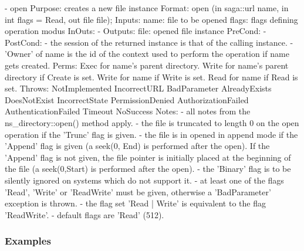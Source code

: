 \begin{myspec}
 
    - open
      Purpose:  creates a new file instance
      Format:   open               (in  saga::url name,
                                    in  int       flags = Read,
                                    out file      file);
      Inputs:   name:               file to be opened
                flags:              flags defining operation
                                    modus
      InOuts:   -
      Outputs:  file:               opened file instance
      PreCond:  -
      PostCond: - the session of the returned instance is that of
                  the calling instance.
                - 'Owner' of name is the id of the context
                  used to perform the operation if name gets
                  created.
      Perms:    Exec  for name's parent directory.
                Write for name's parent directory if Create is set.
                Write for name if Write is set.
                Read  for name if Read  is set.
      Throws:   NotImplemented
                IncorrectURL
                BadParameter
                AlreadyExists
                DoesNotExist
                IncorrectState
                PermissionDenied
                AuthorizationFailed
                AuthenticationFailed
                Timeout
                NoSuccess
      Notes:    - all notes from the ns_directory::open() method
                  apply.
                - the file is truncated to length 0 on the open
                  operation if the 'Trunc' flag is given.
                - the file is in opened in append mode if the
                  'Append' flag is given (a seek(0, End) is
                  performed after the open).  If the 'Append'
                  flag is not given, the file pointer is
                  initially placed at the beginning of the file 
                  (a seek(0,Start) is performed after the open).
                - the 'Binary' flag is to be silently ignored on
                  systems which do not support it.
                - at least one of the flags 'Read', 'Write' or
                  'ReadWrite' must be given, otherwise a
                  'BadParameter' exception is thrown.
                - the flag set 'Read | Write' is equivalent to
                  the flag 'ReadWrite'.
                - default flags are 'Read' (512).
 \end{myspec}
 
 
 \subsubsection{Examples}
 
